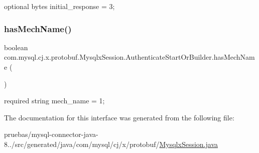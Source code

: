 {\ttfamily optional bytes initial\+\_\+response = 3;} \mbox{\label{interfacecom_1_1mysql_1_1cj_1_1x_1_1protobuf_1_1_mysqlx_session_1_1_authenticate_start_or_builder_a6885f3f6e61f2efd84bc1b8ee567344d}} 
\subsubsection{\texorpdfstring{has\+Mech\+Name()}{hasMechName()}}
{\footnotesize\ttfamily boolean com.\+mysql.\+cj.\+x.\+protobuf.\+Mysqlx\+Session.\+Authenticate\+Start\+Or\+Builder.\+has\+Mech\+Name (\begin{DoxyParamCaption}{ }\end{DoxyParamCaption})}

{\ttfamily required string mech\+\_\+name = 1;} 

The documentation for this interface was generated from the following file\+:\begin{DoxyCompactItemize}
\item 
pruebas/mysql-\/connector-\/java-\/8../src/generated/java/com/mysql/cj/x/protobuf/\mbox{\hyperlink{generated_2java_2com_2mysql_2cj_2x_2protobuf_2_mysqlx_session_8java}{Mysqlx\+Session.\+java}}\end{DoxyCompactItemize}
